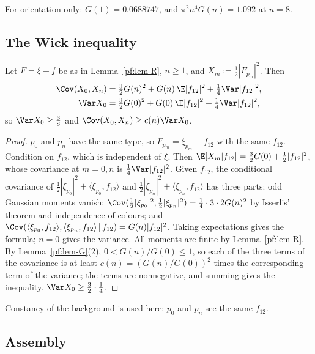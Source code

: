 For orientation only: $G(1)=0.0688747$, and $\pi^2n^4G(n)=1.092$ at $n=8$.

\subsection{The Wick inequality}\label{pf:sec-wick}

\begin{lemma}\label{pf:lem-wick}
Let $F=\xi+f$ be as in Lemma~\ref{pf:lem-R}, $n\ge1$, and $X_m:=\tfrac12|F_{p_m}|^2$. Then
\begin{align*}
\Cov(X_0,X_n)&=\tfrac32G(n)^2+G(n)\,\E|f_{12}|^2+\tfrac14\Var|f_{12}|^2,\\
\Var X_0&=\tfrac32G(0)^2+G(0)\,\E|f_{12}|^2+\tfrac14\Var|f_{12}|^2,
\end{align*}
so $\Var X_0\ge\tfrac38$ and $\Cov(X_0,X_n)\ge c(n)\Var X_0$.
\end{lemma}

\begin{proof}
$p_0$ and $p_n$ have the same type, so $F_{p_m}=\xi_{p_m}+f_{12}$ with the same $f_{12}$. Condition on $f_{12}$, which is independent of $\xi$. Then $\E[X_m|f_{12}]=\tfrac32G(0)+\tfrac12|f_{12}|^2$, whose covariance at $m=0,n$ is $\tfrac14\Var|f_{12}|^2$. Given $f_{12}$, the conditional covariance of $\tfrac12|\xi_{p_0}|^2+\langle\xi_{p_0},f_{12}\rangle$ and $\tfrac12|\xi_{p_n}|^2+\langle\xi_{p_n},f_{12}\rangle$ has three parts: odd Gaussian moments vanish; $\Cov(\tfrac12|\xi_{p_0}|^2,\tfrac12|\xi_{p_n}|^2)=\tfrac14\cdot3\cdot2G(n)^2$ by Isserlis' theorem and independence of colours; and $\Cov(\langle\xi_{p_0},f_{12}\rangle,\langle\xi_{p_n},f_{12}\rangle\,|\,f_{12})=G(n)|f_{12}|^2$. Taking expectations gives the formula; $n=0$ gives the variance. All moments are finite by Lemma~\ref{pf:lem-R}. By Lemma~\ref{pf:lem-G}(2), $0<G(n)/G(0)\le1$, so each of the three terms of the covariance is at least $c(n)=(G(n)/G(0))^2$ times the corresponding term of the variance; the terms are nonnegative, and summing gives the inequality. $\Var X_0\ge\frac32\cdot\frac14$.
\end{proof}

Constancy of the background is used here: $p_0$ and $p_n$ see the same $f_{12}$.

\subsection{Assembly}\label{pf:sec-assembly}

